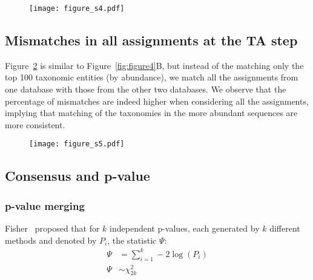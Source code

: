     \begin{figure}[H]
      \centering
      \texttt{[image: figure\_s4.pdf]}
    \end{figure}
    \begin{figure}[H]
      \centering
        \caption{
        }
      \label{fig:figure_s4}
    \end{figure}
    \FloatBarrier
    \newpage

  \subsection*{Mismatches in all assignments at the \ac{TA} step}

    Figure~\ref{fig:figure_s5} is similar to Figure~\ref{fig:figure4}B, but instead of the matching only the top 100 taxonomic entities (by abundance), we match all the assignments from one database with those from the other two databases.
    We observe that the percentage of mismatches are indeed higher when considering all the assignments, implying that matching of the taxonomies in the more abundant sequences are more consistent.

    \begin{figure}[H]
      \centering
      \texttt{[image: figure\_s5.pdf]}
    \end{figure}
    \begin{figure}[H]
      \centering
        \caption{
        }
      \label{fig:figure_s5}
    \end{figure}
    \FloatBarrier
    \newpage


  \subsection*{Consensus and p-value}

  \subsubsection*{p-value merging}
  Fisher~\cite{fisher_224a_1948} proposed that for $k$ independent p-values, each generated by $k$ different methods and denoted by $P_i$, the statistic $\Psi$:
  \begin{equation*}
    \begin{aligned}
        \Psi &= \sum_{i=1}^k -2 \log \left( P_i \right) \\
        \Psi &\sim \chi^2_{2k}
    \end{aligned}
  \end{equation*}

